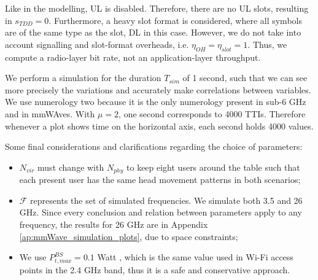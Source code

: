 Like in the modelling, UL is disabled. Therefore, there are no UL slots, resulting in $s_{TDD} = 0$. Furthermore, a heavy slot format is considered, where all symbols are of the same type as the slot, DL in this case. However, we do not take into account signalling and slot-format overheads, i.e. $\eta_{OH} = \eta_{slot} = 1$. Thus, we compute a radio-layer bit rate, not an application-layer throughput. 

We perform a simulation for the duration $T_{sim}$ of 1 second, such that we can see more precisely the variations and accurately make correlations between variables. We use numerology two because it is the only numerology present in sub-6 GHz and in mmWAves. With $\mu=2$, one second corresponds to 4000 TTIs. Therefore whenever a plot shows time on the horizontal axis, each second holds 4000 values.

Some final considerations and clarifications regarding the choice of parameters:

\begin{itemize}
    \item $N_{vir}$ must change with $N_{phy}$ to keep eight users around the table such that each present user has the same head movement patterns in both scenarios;
    \item $\mathcal{F}$ represents the set of simulated frequencies. We simulate both 3.5 and 26 GHz. Since every conclusion and relation between parameters apply to any frequency, the results for 26 GHz are in Appendix \ref{ap:mmWave_simulation_plots}, due to space constraints;
    \item We use $P_{t,max}^{BS} = 0.1 $ Watt \cite{etsi_wifi_tx_power}, which is the same value used in Wi-Fi access points in the 2.4 GHz band, thus it is a safe and conservative approach.
\end{itemize}



